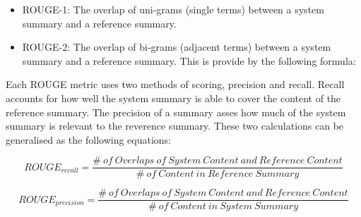 \begin{itemize}
    \item ROUGE-1: The overlap of uni-grams (single terms) between a system summary and a reference summary.
    \item ROUGE-2: The overlap of bi-grams (adjacent terms) between a system summary and a reference summary. This is provide by the following formula:
\end{itemize}

Each ROUGE metric uses two methods of scoring, precision and recall. Recall accounts for how well the system summary is able to cover the content of the reference summary. The precision of a summary asses how much of the system summary is relevant to the reverence summary. These two calculations can be generalised as the following equations:

\begin{equation*}
    ROUGE_{recall} = \frac{\#\:of\: Overlaps\: of \:System\: Content \:and \:Reference\: Content}{\#\: of\: Content\: in\: Reference\: Summary}
    \label{rouge_r2}
\end{equation*}

\begin{equation*}
    ROUGE_{precision} = \frac{\# \:of\: Overlaps\: of\: System\: Content\: and\: Reference\: Content}{\#\: of\: Content\: in\: System\: Summary}
    \label{rouge_p3}
\end{equation*}